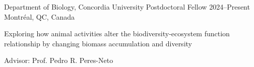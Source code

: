 

\begin{cventries}
  \cventry
    {\normalsize Department of Biology, Concordia University} %
    {\normalsize Postdoctoral Fellow} %
    {\normalsize 2024--Present} %
    {\normalsize Montr\'{e}al, QC, Canada} %
    {\normalsize
      \begin{cvitems} %
        \item {Exploring how animal activities alter the biodiversity-ecosystem function relationship by changing biomass accumulation and diversity}
        \item Advisor: Prof. Pedro R. Peres-Neto
      \end{cvitems} 
    }
\end{cventries}
